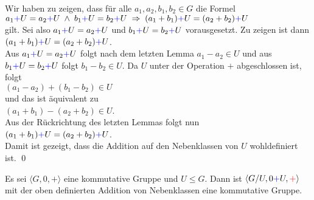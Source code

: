 \proof
Wir haben zu zeigen, dass f\"{u}r alle $a_1,a_2,b_1,b_2 \in G$ die Formel
\\[0.2cm]
\hspace*{1.3cm}
$a_1 {\color{blue}{+}} U = a_2 {\color{blue}{+}} U \;\wedge\; b_1 {\color{blue}{+}} U = b_2 {\color{blue}{+}} U \;\Rightarrow\; (a_1 + b_1) {\color{blue}{+}} U = (a_2 + b_2) {\color{blue}{+}} U$
\\[0.2cm]
gilt.  Sei also $a_1 {\color{blue}{+}} U = a_2 {\color{blue}{+}} U$ und $b_1 {\color{blue}{+}} U = b_2 {\color{blue}{+}} U$ vorausgesetzt.  
Zu zeigen ist dann
\\[0.2cm]
\hspace*{1.3cm}
$(a_1 + b_1) {\color{blue}{+}} U = (a_2 + b_2) {\color{blue}{+}} U$.
\\[0.2cm]
Aus $a_1 {\color{blue}{+}} U = a_2 {\color{blue}{+}} U$ folgt nach dem letzten Lemma $a_1 - a_2 \in U$  und aus
$b_1 {\color{blue}{+}} U = b_2 {\color{blue}{+}} U$ folgt $b_1 - b_2 \in U$.  Da $U$ unter der Operation $+$ abgeschlossen ist, folgt
\\[0.2cm]
\hspace*{1.3cm}
$(a_1 - a_2) + (b_1 - b_2) \in U$
\\[0.2cm]
und das ist \"{a}quivalent zu
\\[0.2cm]
\hspace*{1.3cm}
$(a_1 + b_1) - (a_2 + b_2) \in U$.
\\[0.2cm]
Aus der R\"{u}ckrichtung des letzten  Lemmas folgt nun
\\[0.2cm]
\hspace*{1.3cm}
$(a_1 + b_1) {\color{blue}{+}}  U = (a_2 + b_2) {\color{blue}{+}} U$.
\\[0.2cm]
Damit ist gezeigt, dass die Addition auf den Nebenklassen von $U$ wohldefiniert ist. 
\qed

\begin{Satz}
 Es sei $\langle G, 0, + \rangle$ eine kommutative Gruppe und $U \leq G$.
 Dann ist $\langle G/U, 0 {\color{blue}{+}} U, {\color{red}{+}} \rangle$ mit der oben definierten Addition von Nebenklassen eine kommutative Gruppe.
\end{Satz}

